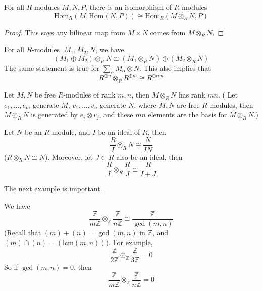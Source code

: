 \documentclass[openany]{book}
\newcommand{\Z}{\mathbb{Z}}
\begin{document}
\begin{prop}
    For all $R$-modules $M,N,P$, there is an isomorphism of $R$-modules
    \begin{equation*}
        \text{Hom}_R(M,\text{Hom}(N,P))\cong\text{Hom}_R(M\otimes_RN,P)
    \end{equation*}
\end{prop}
\begin{proof}
    This says any bilinear map from $M\times N$ comes from $M\otimes_RN$.
\end{proof}

\begin{prop}
    For all $R$-modules, $M_1,M_2, N$, we have 
    \begin{equation*}
        (M_1\oplus M_2)\otimes_RN\cong (M_1\otimes_RN)\oplus(M_2\otimes_RN)
    \end{equation*}
    The same statement is true for $\sum_\alpha M_\alpha\otimes N$. This also implies that 
    \begin{equation*}
        R^{\oplus n}\otimes_R R^{\oplus m}\cong R^{\oplus nm}
    \end{equation*}
\end{prop}


\begin{prop}
    Let $M,N$ be free $R$-modules of rank $m,n$, then $M\otimes_R N$ has rank $mn$.
   ( Let $e_1,\dots, e_m$ generate $M$, $v_1,\dots, v_n$ generate $N$, where $M,N$ are free $R$-modules, then $M\otimes_RN$ is generated by $e_i\otimes v_j$, and these $mn$ elements are the basis for $M\otimes_RN$.)
\end{prop}

\begin{prop}
    Let $N$ be an $R$-module, and $I$ be an ideal of $R$, then 
    \begin{equation*}
        \frac{R}{I}\otimes_RN\cong\frac{N}{IN}
    \end{equation*}
    ($R\otimes_RN\cong N$). Moreover, let $J\subset R$ also be an ideal, then 
    \begin{equation*}
        \frac{R}{I}\otimes_R\frac{R}{J}\cong\frac{R}{I+J}
    \end{equation*}
\end{prop}


\begin{warn}
    The next example is important.
\end{warn}

\begin{example}
    We have 
    \begin{equation*}
        \frac{\Z}{m\Z}\otimes_\Z\frac{\Z}{n\Z}\cong\frac{\Z}{\gcd(m,n)}
    \end{equation*}
    (Recall that $(m)+(n)=\gcd(m,n)$ in $\Z$, and $(m)\cap(n)=(\text{lcm}(m,n)))$. For example, 
    \begin{equation*}
        \frac{\Z}{2\Z}\otimes_\Z\frac{\Z}{3\Z}=0
    \end{equation*}
    So if $\gcd(m,n)=0$, then 
    \begin{equation*}
        \frac{\Z}{m\Z}\otimes_\Z\frac{\Z}{n\Z}=0
    \end{equation*}
\end{example}
\end{document}
